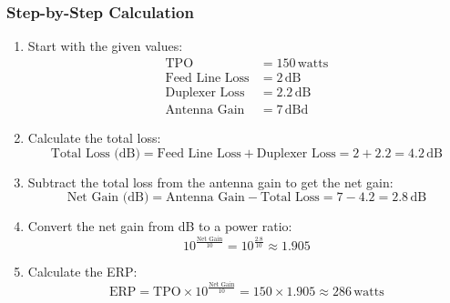 \subsubsection*{Step-by-Step Calculation}

\begin{enumerate}
    \item Start with the given values:
    \begin{align*}
    \text{TPO} &= 150 \, \text{watts} \\
    \text{Feed Line Loss} &= 2 \, \text{dB} \\
    \text{Duplexer Loss} &= 2.2 \, \text{dB} \\
    \text{Antenna Gain} &= 7 \, \text{dBd}
    \end{align*}

    \item Calculate the total loss:
    \[
    \text{Total Loss (dB)} = \text{Feed Line Loss} + \text{Duplexer Loss} = 2 + 2.2 = 4.2 \, \text{dB}
    \]

    \item Subtract the total loss from the antenna gain to get the net gain:
    \[
    \text{Net Gain (dB)} = \text{Antenna Gain} - \text{Total Loss} = 7 - 4.2 = 2.8 \, \text{dB}
    \]

    \item Convert the net gain from dB to a power ratio:
    \[
    10^{\frac{\text{Net Gain}}{10}} = 10^{\frac{2.8}{10}} \approx 1.905
    \]

    \item Calculate the ERP:
    \[
    \text{ERP} = \text{TPO} \times 10^{\frac{\text{Net Gain}}{10}} = 150 \times 1.905 \approx 286 \, \text{watts}
    \]
\end{enumerate} 



